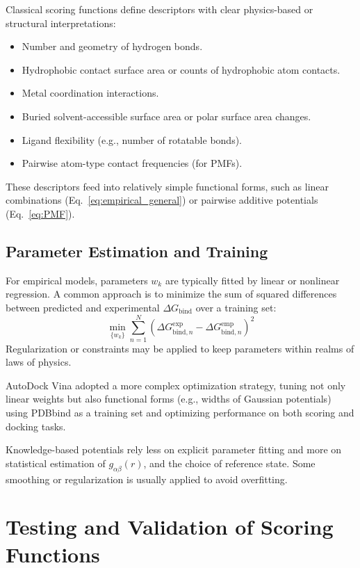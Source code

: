 \documentclass[12pt]{article}
\begin{document}
Classical scoring functions define descriptors with clear physics-based or structural interpretations:
\begin{itemize}
    \item Number and geometry of hydrogen bonds.
    \item Hydrophobic contact surface area or counts of hydrophobic atom contacts.
    \item Metal coordination interactions.
    \item Buried solvent-accessible surface area or polar surface area changes.
    \item Ligand flexibility (e.g., number of rotatable bonds).
    \item Pairwise atom-type contact frequencies (for PMFs).
\end{itemize}
These descriptors feed into relatively simple functional forms, such as linear combinations (Eq.~\ref{eq:empirical_general}) or pairwise additive potentials (Eq.~\ref{eq:PMF}).


\subsection{Parameter Estimation and Training}

For empirical models, parameters $w_k$ are typically fitted by linear or nonlinear regression. A common approach is to minimize the sum of squared differences between predicted and experimental $\Delta G_{\text{bind}}$ over a training set:
\begin{equation}
\min_{\{w_k\}} \sum_{n=1}^{N} \left( \Delta G_{\text{bind},n}^{\text{exp}} - \Delta G_{\text{bind},n}^{\text{emp}} \right)^2
\label{eq:parameter_fitting}
\end{equation}
Regularization or constraints may be applied to keep parameters within realms of laws of physics.

AutoDock Vina adopted a more complex optimization strategy, tuning not only linear weights but also functional forms (e.g., widths of Gaussian potentials) using PDBbind as a training set and optimizing performance on both scoring and docking tasks.\cite{CH3_Trott2010_Vina}

Knowledge-based potentials rely less on explicit parameter fitting and more on statistical estimation of $g_{\alpha\beta}(r)$, and the choice of reference state. Some smoothing or regularization is usually applied to avoid overfitting.

\section{Testing and Validation of Scoring Functions}
\end{document}
